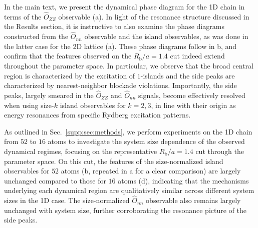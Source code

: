 \documentclass[english,floatfix,twocolumn,showpacs, aps, prx, reprint, superscriptaddress, longbibliography]{revtex4-2}
\begin{document}
In the main text, we present the dynamical phase diagram for the 1D chain in terms of the $\hat{O}_{ZZ}$ observable (a). In light of the resonance structure discussed in the Results section, it is instructive to also examine the phase diagrams constructed from the $\hat{O}_{nn}$ observable and the island observables, as was done in the latter case for the 2D lattice (a). These phase diagrams follow in b, and confirm that the features observed on the $R_\mathrm{b} / a = 1.4$ cut indeed extend throughout the parameter space. In particular, we observe that the broad central region is characterized by the excitation of $1$-islands and the side peaks are characterized by nearest-neighbor blockade violations. Importantly, the side peaks, largely smeared in the $\hat{O}_{ZZ}$ and $\hat{O}_{nn}$ signals, become effectively resolved when using size-$k$ island observables for $k = 2, 3$, in line with their origin as energy resonances from specific Rydberg excitation patterns. 

As outlined in Sec.~\ref{supp:sec:methods}, we perform experiments on the 1D chain from $52$ to $16$ atoms to investigate the system size dependence of the observed dynamical regimes, focusing on the representative $R_\mathrm{b} / a = 1.4$ cut through the parameter space. On this cut, the features of the size-normalized island observables for $52$ atoms (b, repeated in a for a clear comparison) are largely unchanged compared to those for $16$ atoms (d), indicating that the mechanisms underlying each dynamical region are qualitatively similar across different system sizes in the 1D case. The size-normalized $\hat{O}_{nn}$ observable also remains largely unchanged with system size, further corroborating the resonance picture of the side peaks.
\end{document}
